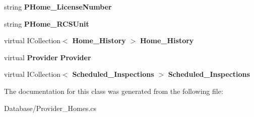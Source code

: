 \begin{DoxyCompactItemize}
\mbox{\label{class_a_f_h___scheduler_1_1_database_1_1_provider___homes_a8513e96c012c5843eb2294a3268b5eb8}} 
string {\bfseries P\+Home\+\_\+\+License\+Number}\hspace{0.3cm}{\ttfamily  [get, set]}
\item 
\mbox{\label{class_a_f_h___scheduler_1_1_database_1_1_provider___homes_aeb14f294a4bf22b6b2f4d2463a22d405}} 
string {\bfseries P\+Home\+\_\+\+R\+C\+S\+Unit}\hspace{0.3cm}{\ttfamily  [get, set]}
\item 
\mbox{\label{class_a_f_h___scheduler_1_1_database_1_1_provider___homes_ae9d92c2d9d90143882799000ee5bcad3}} 
virtual I\+Collection$<$ \textbf{ Home\+\_\+\+History} $>$ {\bfseries Home\+\_\+\+History}\hspace{0.3cm}{\ttfamily  [get, set]}
\item 
\mbox{\label{class_a_f_h___scheduler_1_1_database_1_1_provider___homes_a38ef4b353d7453fea775c96029de68e7}} 
virtual \textbf{ Provider} {\bfseries Provider}\hspace{0.3cm}{\ttfamily  [get, set]}
\item 
\mbox{\label{class_a_f_h___scheduler_1_1_database_1_1_provider___homes_a5937a1cc8ba11911292f85c0260b343a}} 
virtual I\+Collection$<$ \textbf{ Scheduled\+\_\+\+Inspections} $>$ {\bfseries Scheduled\+\_\+\+Inspections}\hspace{0.3cm}{\ttfamily  [get, set]}
\end{DoxyCompactItemize}


The documentation for this class was generated from the following file\+:\begin{DoxyCompactItemize}
\item 
Database/Provider\+\_\+\+Homes.\+cs\end{DoxyCompactItemize}
